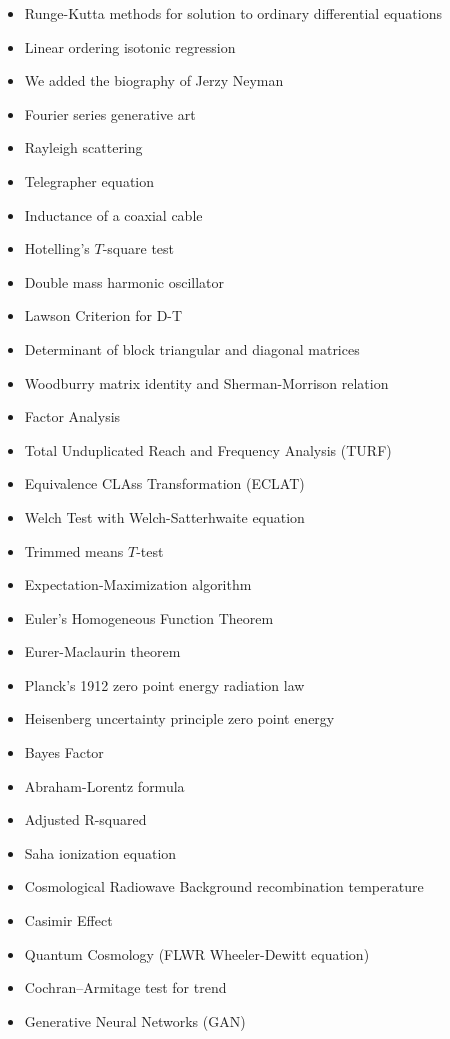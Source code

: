 \documentclass[12pt,a4paper,twoside,openright]{report}
\theoremstyle{definition}
\theoremstyle{itexmp}
\numberwithin{equation}{section}
\begin{document}
\begin{itemize}
\begin{itemize}[noitemsep]
			\item Runge-Kutta methods for solution to ordinary differential equations
			\item Linear ordering isotonic regression
			\item We added the biography of Jerzy Neyman
			\item Fourier series generative art
			\item Rayleigh scattering
			\item Telegrapher equation
			\item Inductance of a coaxial cable
			\item Hotelling's $T$-square test
			\item Double mass harmonic oscillator
			\item Lawson Criterion for D-T
			\item Determinant of block triangular and diagonal matrices
			\item Woodburry matrix identity and Sherman-Morrison relation
			\item Factor Analysis
			\item Total Unduplicated Reach and Frequency Analysis (TURF)
			\item Equivalence CLAss Transformation (ECLAT)
			\item Welch Test with Welch-Satterhwaite equation
			\item Trimmed means $T$-test
			\item Expectation-Maximization algorithm
			\item Euler's Homogeneous Function Theorem
			\item Eurer-Maclaurin theorem
			\item Planck's 1912 zero point energy radiation law
			\item Heisenberg uncertainty principle zero point energy
			\item Bayes Factor
			\item Abraham-Lorentz formula
			\item Adjusted R-squared
			\item Saha ionization equation
			\item Cosmological Radiowave Background recombination temperature
			\item Casimir Effect
			\item Quantum Cosmology (FLWR Wheeler-Dewitt equation)
			\item Cochran–Armitage test for trend
			\item Generative Neural Networks (GAN)

\end{itemize}
\end{itemize}
\end{document}
